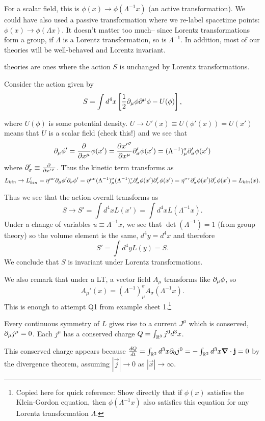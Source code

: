 For a scalar field, this is $\phi(x)\to \phi(\Lambda^{-1}x)$ (an active transformation). We could have also used a passive transformation where we re-label spacetime points: $\phi(x)\to \phi(\Lambda x)$. It doesn't matter too much-- since Lorentz transformations form a group, if $\Lambda$ is a Lorentz transformation, so is $\Lambda^{-1}$. In addition, most of our theories will be well-behaved and Lorentz invariant.

\begin{defn}
 theories are ones where the action $S$ is unchanged by Lorentz transformations.
\end{defn}

\begin{exm}
Consider the action given by
$$S=\int d^4x \left[\frac{1}{2} \partial_\mu \phi \partial^\mu \phi-U(\phi)\right],$$
\end{exm}
where $U(\phi)$ is some potential density. $U\to U'(x) \equiv U(\phi'(x))= U(x')$ means that $U$ is a scalar field (check this!) and we see that
$$\partial_\mu \phi' =\frac{\partial^{} }{\partial {x^\mu} ^{}}\phi(x')=\frac{\partial^{} {{x'}^\sigma}}{\partial {x^\mu} ^{}} \partial_\sigma' \phi(x')= (\Lambda^{-1})^\sigma_\mu \partial_\sigma' \phi(x')$$
where $\partial_\sigma' \equiv \frac{\partial^{} }{\partial {{x'}^\sigma} ^{}}$.
Thus the kinetic term transforms as
$$L_{kin} \to L_{kin}'=\eta^{\mu\nu}\partial_\mu \phi' \partial_\nu \phi' =\eta^{\mu\nu}(\Lambda^{-1})^\sigma_\mu (\Lambda^{-1})^\tau_\nu \partial_\sigma' \phi(x') \partial_\tau' \phi(x')=\eta^{\sigma\tau} \partial_\sigma' \phi(x')\partial_\tau' \phi(x') = L_{kin}(x).$$

Thus we see that the action overall transforms as
$$S\to S' = \int d^4 xL(x')=\int d^4 x L(\Lambda^{-1}x).$$
Under a change of variables $u \equiv \Lambda^{-1} x$, we see that $\det(\Lambda^{-1})=1$ (from group theory) so the volume element is the same, $d^4y=d^4x$ and therefore
$$S'=\int d^4 y L(y)=S.$$
We conclude that $S$ is invariant under Lorentz transformations.

We also remark that under a LT, a vector field $A_\mu$ transforms like $\partial_\mu \phi$, so $$A_\mu'(x) = (\Lambda^{-1})^\sigma_\mu A_\sigma (\Lambda^{-1}x).$$
This is enough to attempt Q1 from example sheet 1.\footnote{Copied here for quick reference: Show directly that if $\phi(x)$ satisfies the Klein-Gordon equation, then $\phi(\Lambda^{-1} x)$ also satisfies this equation for any Lorentz transformation $\Lambda.$}

\begin{thm}
Every continuous symmetry of $L$ gives rise to a current $J^\mu$ which is conserved, $\partial_\mu j^\mu=0$. Each $j^\mu$ has a conserved charge $Q=\int_{\mathbb{R}^3} j^0 d^3x$.

This conserved charge appears because $\frac{dQ}{dt}=\int_{\mathbb{R}^3} d^3x \partial_0 j^0  = -\int_{\mathbb{R}^3} d^3 x \mbox{\boldmath$ \nabla $} \cdot \boldsymbol{\mathbf{j}} =0$ by the divergence theorem, assuming $|\vec{j}|\to 0$ as $|\vec{x}|\to \infty$.
\end{thm}

